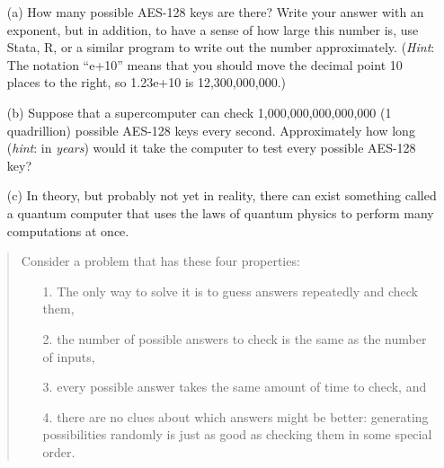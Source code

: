 \begin{enumerate}
\setlength\itemsep{3pt}
\item[(a)] How many possible AES-128 keys are there? Write your answer with an exponent, but in addition, to have a sense of how large this number is, use Stata, R, or a similar program to write out the number approximately. (\textit{Hint}: The notation ``e+10'' means that you should move the decimal point 10 places to the right, so 1.23e+10 is 12,300,000,000.) 
\item[(b)] Suppose that a supercomputer can check 1,000,000,000,000,000 (1 quadril\-lion) possible AES-128 keys every second.  Approximately how long (\textit{hint}: in \textit{years}) would it take the computer to test every possible AES-128 key? 
\item[(c)] In theory, but probably not yet in reality, there can exist something called a quantum computer that uses the laws of quantum physics to perform many computations at once. 
\end{enumerate}

\begin{quotation}
\noindent Consider a problem that has these four properties:
\begin{enumerate}
\item[1.] The only way to solve it is to guess answers repeatedly and check them,
\item[2.] the number of possible answers to check is the same as the number of inputs,
\item[3.] every possible answer takes the same amount of time to check, and
\item[4.] there are no clues about which answers might be better: generating possibilities randomly is just as good as checking them in some special order.
\end{enumerate}\vspace{3pt}

\end{quotation}